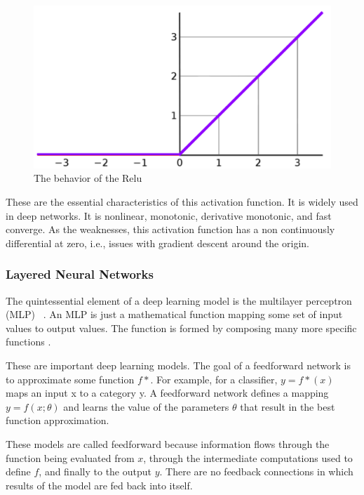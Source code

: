 \begin{figure}[H]
\centering
\includegraphics[scale=0.2]{imagens/relu_corrected.png}
\caption{The behavior of the Relu \cite{lecture}}
\label{fig:relu}
\end{figure} 

These are the essential characteristics of this activation function. It is widely used in deep networks. It is nonlinear, monotonic, derivative monotonic, and fast converge. As the weaknesses, this activation function has a non continuously differential at zero, i.e., issues with gradient descent around the origin.



\subsubsection{Layered Neural Networks}

The quintessential element of a deep learning model is the multilayer perceptron (MLP) ~\cite{goodfellow2016deep}. An MLP is just a mathematical function mapping some set of input values to output values. The function
is formed by composing many more specific functions \cite{goodfellow2016deep}.


These are important deep learning models. The goal
of a feedforward network is to approximate some function $f*$. For example, for a classifier, $y = f*(x)$ maps an input x to a category y. A feedforward network
defines a mapping $y = f (x; \theta)$ and learns the value of the parameters $\theta$ that result in the best function approximation.

These models are called feedforward because information flows through the function being evaluated from $x$, through the intermediate computations used to define $f$, and finally to the output $y$. There are no feedback connections in which results of the model are fed back into itself.



